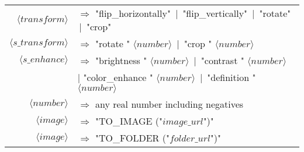 \begin{tabular}{r l}
    $\langle transform \rangle$ & $\Rightarrow$ "flip\_horizontally" \,|\, "flip\_vertically" \,|\, "rotate" \,|\, "crop" \\
    
    $\langle s\_transform \rangle$ & $\Rightarrow$ "rotate " $\langle number \rangle$ \,|\, "crop " $\langle number \rangle$ \\
    
    $\langle s\_enhance \rangle$ & $\Rightarrow$ "brightness " $\langle number \rangle$ \,|\, "contrast " $\langle number \rangle$ \\
    & \quad | "color\_enhance " $\langle number \rangle$ \,|\, "definition " $\langle number \rangle$ \\
    
    $\langle number \rangle$ & $\Rightarrow$ any real number including negatives \\
    
    $\langle image \rangle$ & $\Rightarrow$ "TO\_IMAGE ("$image\_url$")" \\
    
    $\langle image \rangle$ & $\Rightarrow$ "TO\_FOLDER ("$folder\_url$")" \\
\end{tabular}